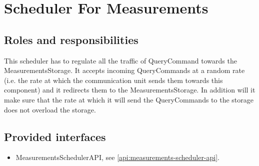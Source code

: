 \section{Scheduler For Measurements}
\label{element:measurements-scheduler}

\subsection{Roles and responsibilities}

\npar This scheduler has to regulate all the traffic of QueryCommand towards the
MeasurementsStorage. It accepts incoming QueryCommands at a random rate (i.e.
the rate at which the communication unit sends them towards this component) and
it redirects them to the MeasurementsStorage. In addition will it make sure
that the rate at which it will send the QueryCommands to the storage does not
overload the storage.

\subsection{Provided interfaces}

\begin{itemize}
  \item MeasurementsSchedulerAPI, see \ref{api:measurements-scheduler-api}.
\end{itemize}



